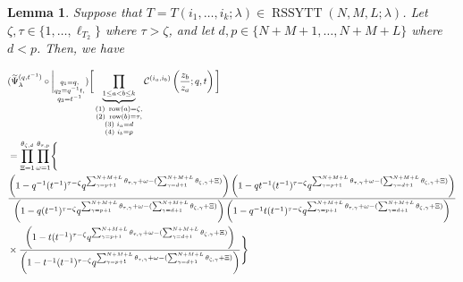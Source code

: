 \documentclass[12pt,reqno,a4paper]{amsart}
\newcommand{\comp}{\circ}
\newcommand{\cals}[1]{\mathcal{#1}}
\numberwithin{equation}{section}
\newtheorem{lem}[thm]{Lemma}
\theoremstyle{definition}
\begin{document}
\begin{lem}
\label{lemm39-1329-1aug}
Suppose that $T = T(i_1,\dots,i_k;\lambda) \in \operatorname{RSSYTT}(N,M,L;\lambda)$. Let $\zeta, \tau \in \{1,\dots,\ell_{T_2}\}$ where $\tau > \zeta$, 
and let $d, p \in \{N+M+1,\dots,N+M+L\}$ where $d < p$. Then, we have 

\footnotesize
\begin{align}
	&(
	\widetilde{\Psi}_{\lambda}^{(q,t^{-1})}
	\comp 
	\bigg|_{
		\substack{
			q_1 = q, \\
			q_2 = q^{-1}t,\\
			q_3 = t^{-1} \\
		}
	}
	)
	\bigg[
	\underbrace{	\prod_{1 \leq a < b \leq k}				}_{
		\substack{
			(1) \,\, \operatorname{row}(a) = \zeta, 
			\\
			(2) \,\,  \operatorname{row}(b) = \tau, 
			\\
			(3) \,\, i_a = d
			\\
			(4) \,\, i_b = p
		}	
	}
	\cals{C}^{(i_a,i_b)}\left(
	\frac{z_b}{z_a}
	; q, t
	\right)
	\bigg]
	\\
	&= 
	\prod_{\Xi = 1}^{\theta_{\zeta,d}}
	\prod_{\omega = 1}^{\theta_{\tau,p}}
	\Biggl\{
	\notag 
	\\
	&\frac{
		\left(	1 - q^{-1}					
		(t^{-1})^{\tau - \zeta} q^{	\sum_{\gamma = p + 1}^{N + M + L} \theta_{\tau,\gamma}	+ \omega	- (\sum_{\gamma = d + 1}^{N + M + L} \theta_{\zeta,\gamma} + \Xi)		}	
		\right)
		\left(	1 - qt^{-1}			
		(t^{-1})^{\tau - \zeta} q^{	\sum_{\gamma = p + 1}^{N + M + L} \theta_{\tau,\gamma}	+ \omega	- (\sum_{\gamma = d + 1}^{N + M + L} \theta_{\zeta,\gamma} + \Xi)		}
		\right)
	}{
		\left(	1 - q			
		(t^{-1})^{\tau - \zeta} q^{	\sum_{\gamma = p + 1}^{N + M + L} \theta_{\tau,\gamma}	+ \omega	- (\sum_{\gamma = d + 1}^{N + M + L} \theta_{\zeta,\gamma} + \Xi)		}
		\right)
		\left(	1 - q^{-1}t			
		(t^{-1})^{\tau - \zeta} q^{	\sum_{\gamma = p + 1}^{N + M + L} \theta_{\tau,\gamma}	+ \omega	- (\sum_{\gamma = d + 1}^{N + M + L} \theta_{\zeta,\gamma} + \Xi)		}
		\right)
	}
	\notag 
	\\
	&\times
	\frac{
		\left(	1 - t		
		(t^{-1})^{\tau - \zeta} q^{	\sum_{\gamma = p + 1}^{N + M + L} \theta_{\tau,\gamma}	+ \omega	- (\sum_{\gamma = d + 1}^{N + M + L} \theta_{\zeta,\gamma} + \Xi)		}
		\right)
	}{
		\left(	1 - t^{-1}			
		(t^{-1})^{\tau - \zeta} q^{	\sum_{\gamma = p + 1}^{N + M + L} \theta_{\tau,\gamma}	+ \omega	- (\sum_{\gamma = d + 1}^{N + M + L} \theta_{\zeta,\gamma} + \Xi)		}
		\right)
	}
	\Biggr\}
	\notag 
\end{align}
\normalsize
\end{lem}
\end{document}
